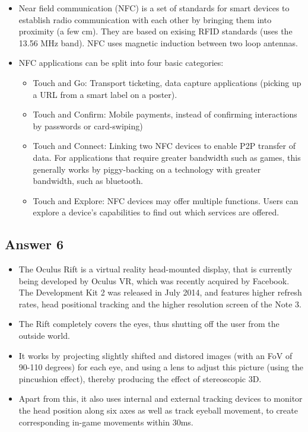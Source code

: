 \documentclass[]{article}
\begin{document}
\begin{itemize}
\itemsep1pt\parskip0pt
\item
  Near field communication (NFC) is a set of standards for smart devices
  to establish radio communication with each other by bringing them into
  proximity (a few cm). They are based on exising RFID standards (uses
  the 13.56 MHz band). NFC uses magnetic induction between two loop
  antennas.
\item
  NFC applications can be split into four basic categories:

  \begin{itemize}
  \itemsep1pt\parskip0pt
  \item
    Touch and Go: Transport ticketing, data capture applications
    (picking up a URL from a smart label on a poster).
  \item
    Touch and Confirm: Mobile payments, instead of confirming
    interactions by passwords or card-swiping)
  \item
    Touch and Connect: Linking two NFC devices to enable P2P transfer of
    data. For applications that require greater bandwidth such as games,
    this generally works by piggy-backing on a technology with greater
    bandwidth, such as bluetooth.
  \item
    Touch and Explore: NFC devices may offer multiple functions. Users
    can explore a device's capabilities to find out which services are
    offered.
  \end{itemize}
\end{itemize}

\subsection{Answer 6}\label{answer-6}

\begin{itemize}
\itemsep1pt\parskip0pt
\item
  The Oculus Rift is a virtual reality head-mounted display, that is
  currently being developed by Oculus VR, which was recently acquired by
  Facebook. The Development Kit 2 was released in July 2014, and
  features higher refresh rates, head positional tracking and the higher
  resolution screen of the Note 3.
\item
  The Rift completely covers the eyes, thus shutting off the user from
  the outside world.
\item
  It works by projecting slightly shifted and distored images (with an
  FoV of 90-110 degrees) for each eye, and using a lens to adjust this
  picture (using the pincushion effect), thereby producing the effect of
  stereoscopic 3D.
\item
  Apart from this, it also uses internal and external tracking devices
  to monitor the head position along six axes as well as track eyeball
  movement, to create corresponding in-game movements within 30ms.
\end{itemize}
\end{document}
